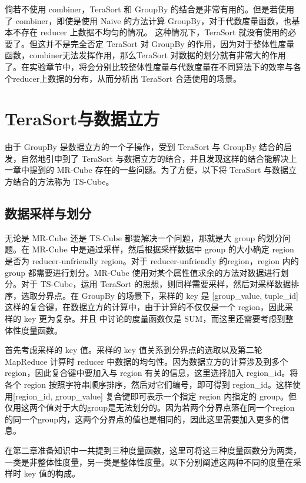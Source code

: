 倘若不使用 combiner，TeraSort 和 GroupBy 的结合是非常有用的。但是若使用了 combiner，即使是使用 Naive 的方法计算 GroupBy，对于代数度量函数，也基本不存在 reducer 上数据不均匀的情况。 这种情况下，TeraSort 就没有使用的必要了。但这并不是完全否定 TeraSort 对 GroupBy 的作用，因为对于整体性度量函数，combiner无法发挥作用，那么TeraSort 对数据的划分就有非常大的作用了。在实验章节中，将会分别比较整体性度量与代数度量在不同算法下的效率与各个reducer上数据的分布，从而分析出 TeraSort 合适使用的场景。

\section{TeraSort与数据立方}

由于 GroupBy 是数据立方的一个子操作，受到 TeraSort 与 GroupBy 结合的启发，自然地引申到了 TeraSort 与数据立方的结合，并且发现这样的结合能解决上一章中提到的 MR-Cube 存在的一些问题。为了方便，以下将 TeraSort 与数据立方结合的方法称为 TS-Cube。

\subsection{数据采样与划分}

无论是 MR-Cube 还是 TS-Cube 都要解决一个问题，那就是大 group 的划分问题。在 MR-Cube 中是通过采样，然后根据采样数据中 group 的大小确定 region 是否为 reducer-unfriendly region。对于 reducer-unfriendly 的region，region 内的 group 都需要进行划分。MR-Cube 使用对某个属性值求余的方法对数据进行划分。对于 TS-Cube，运用 TeraSort 的思想，则同样需要采样，然后对采样数据排序，选取分界点。在 GroupBy 的场景下，采样的 key 是 [group\_value, tuple\_id] 这样的复合键，在数据立方的计算中，由于计算的不仅仅是一个 region，因此采样的 key 更为复杂。并且\cite{tao2013minimal} 中讨论的度量函数仅是 SUM，而这里还需要考虑到整体性度量函数。

首先考虑采样的 key 值。采样的 key 值关系到分界点的选取以及第二轮 MapReduce 计算时 reducer 中数据的均匀性。因为数据立方的计算涉及到多个 region，因此复合键中要加入与 region 有关的信息，这里选择加入 region\_id。将各个 region 按照字符串顺序排序，然后对它们编号，即可得到 region\_id。这样使用[region\_id, group\_value] 复合键即可表示一个指定 region 内指定的 group。但仅用这两个值对于大的group是无法划分的。因为若两个分界点落在同一个region的同一个group内，这两个分界点的值也是相同的，因此这里需要加入更多的信息。

在第二章准备知识中一共提到三种度量函数，这里可将这三种度量函数分为两类，一类是非整体性度量，另一类是整体性度量。以下分别阐述这两种不同的度量在采样时 key 值的构成。

